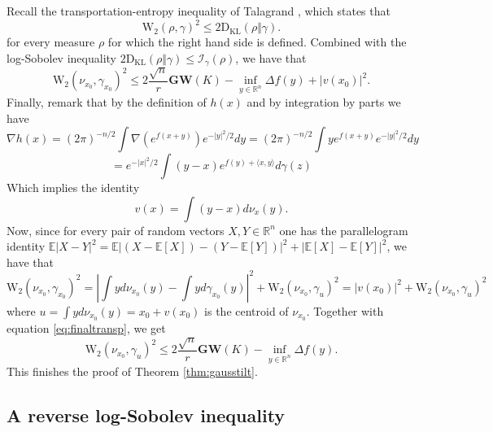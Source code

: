\documentclass[12pt]{article}
\def \I{\mathcal{I}}
\def \WW{\mathrm{W_2}}
\def \RR {\mathbb R}
\def \EE {\mathbb E}
\def \MW {\mathbf{GW}}
\def \KL {\mathrm{D}_{\mathrm{KL}}}
\theoremstyle{definition}
\theoremstyle{remark}
\begin{document}
Recall the transportation-entropy inequality of Talagrand \cite{Talagrand96}, which states that
$$
\WW(\rho, \gamma)^2 \leq 2 \KL(\rho \Vert \gamma).
$$
for every measure $\rho$ for which the right hand side is defined. Combined with the log-Sobolev inequality $2 \KL(\rho \Vert \gamma) \leq \I_{\gamma}(\rho)$, we have that
\begin{equation}\label{eq:finaltransp}
\WW(\nu_{x_0}, \gamma_{x_0})^2 \leq 2 \frac{\sqrt{n}}{r} \MW(K) - \inf_{y \in \RR^n} \Delta f(y) + |v(x_0)|^2.
\end{equation}
Finally, remark that by the definition of $h(x)$ and by integration by parts we have
$$
\nabla h(x) = (2 \pi)^{-n/2} \int \nabla \left (e^{f(x+y)} \right ) e^{-|y|^2/2} d y = (2 \pi)^{-n/2} \int y e^{f(x+y)} e^{-|y|^2/2} d y
$$
$$
= e^{-|x|^2/2} \int (y-x) e^{f(y) + \langle x, y \rangle} d \gamma(z)
$$
Which implies the identity
$$
v(x) = \int (y-x) d \nu_x(y).
$$
Now, since for every pair of random vectors $X,Y \in \RR^n$ one has the parallelogram identity $\EE |X-Y|^2 = \EE |(X - \EE[X]) - (Y - \EE[Y])|^2 + |\EE[X]-\EE[Y]|^2$, we have that
$$
\WW(\nu_{x_0}, \gamma_{x_0})^2 = \left |\int y d \nu_{x_0}(y) - \int y d \gamma_{x_0}(y) \right |^2 + \WW(\nu_{x_0}, \gamma_{u})^2 = |v(x_0)|^2 + \WW(\nu_{x_0}, \gamma_{u})^2
$$
where $u = \int y d \nu_{x_0}(y) = x_0+v(x_0)$ is the centroid of $\nu_{x_0}$. Together with equation \eqref{eq:finaltransp}, we get
$$
\WW(\nu_{x_0}, \gamma_{u})^2 \leq 2 \frac{\sqrt{n}}{r} \MW(K) - \inf_{y \in \RR^n} \Delta f(y).
$$
This finishes the proof of Theorem \ref{thm:gausstilt}.


\subsection{A reverse log-Sobolev inequality}
\end{document}
